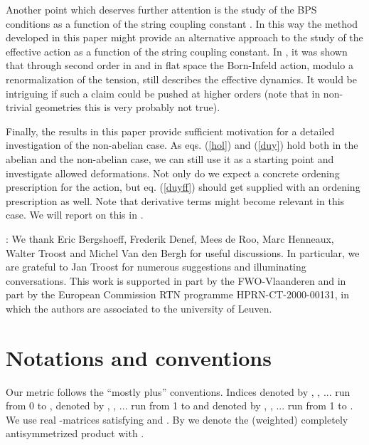 \documentclass[a4paper,12pt,oneside]{article}
\begin{document}
Another point which deserves further attention is the study of the BPS
conditions as a function of the string coupling constant \coordHE{}. In this
way the method developed in this paper might provide an alternative
approach to the study of the effective action as a function of the string
coupling constant. In \cite{AT2}, it was shown that through second order
in \coordHE{} and in flat space the Born-Infeld action, modulo a
renormalization of the tension, still describes the effective dynamics.
It would be intriguing if such a claim could be pushed at higher orders
(note that in non-trivial geometries this is very probably not true).

Finally, the results in this paper provide sufficient motivation for a
detailed investigation of the non-abelian case. As eqs. (\ref{hol}) and
(\ref{duy}) hold both in the abelian and the non-abelian case, we can
still use it as a starting point and investigate allowed deformations.
Not only do we expect a concrete ordening prescription for the action,
but eq. (\ref{duyff}) should get supplied with an ordening prescription
as well. Note that derivative terms might become relevant in this case.
We will report on this in \cite{wij}.

\vspace{5mm}

:
We thank Eric Bergshoeff, Frederik Denef, Mees de Roo, Marc Henneaux,
Walter Troost and Michel Van den Bergh for useful discussions. In
particular, we are grateful to Jan Troost for numerous suggestions and
illuminating conversations. This work is supported in part by the
FWO-Vlaanderen and in part by the European Commission RTN programme
HPRN-CT-2000-00131, in which the authors are associated to the university
of Leuven.

\vspace{5mm}

\appendix

\setcounter{equation}{0}
\section{Notations and conventions}
Our metric follows the ``mostly plus'' conventions. Indices denoted
by \myHighlight{$\mu $}\coordHE{}, \myHighlight{$\nu$}\coordHE{}, ... run from 0 
to \coordHE{}, denoted by \coordHE{}, \coordHE{}, ... run from 1 to \coordHE{} and denoted by
\myHighlight{$\alpha $}\coordHE{}, \myHighlight{$\beta$}\coordHE{}, ... run from 1 to \coordHE{}. We use real \coordHE{} 
\myHighlight{$\gamma$}\coordHE{}-matrices satisfying \coordHE{} and 
\coordHE{}. By \coordHE{} we denote the (weighted) completely antisymmetrized product 
\coordHE{} with \myHighlight{$[[\cdots ]] 
= [\cdots ]$}\coordHE{}.
\end{document}
